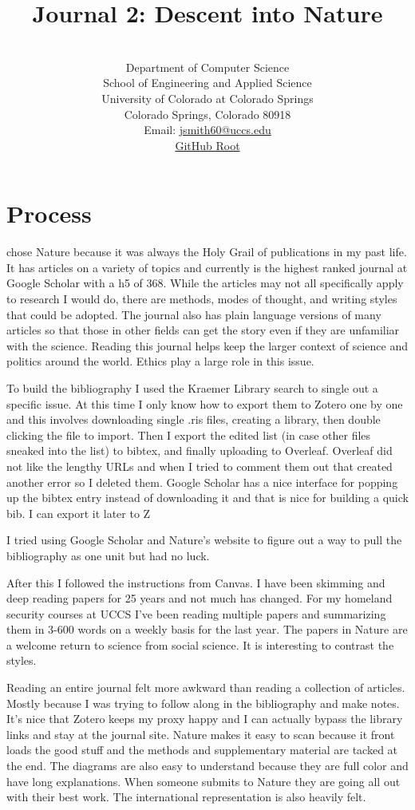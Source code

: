 \documentclass{article}
\title{Journal 2: Descent into Nature}
\author{\myname\\
Department of Computer Science\\School of Engineering and Applied Science\\University of Colorado at Colorado Springs\\Colorado Springs, Colorado 80918\\Email: \href{mailto:jsmith@uccs.edu}{jsmith60@uccs.edu}\\
\href{https://github.com/morisey/UCCS}{GitHub Root}
}
\begin{document}
\maketitle
\section{Process}
\lettrine[findent=2pt]{}{ }chose Nature \cite{nature} because it was always the Holy Grail of publications in my past life. It has articles on a variety of topics and currently is the highest ranked journal at Google Scholar with a h5 of 368. While the articles may not all specifically apply to research I would do, there are methods, modes of thought, and writing styles that could be adopted. The journal also has plain language versions of many articles so that those in other fields can get the story even if they are unfamiliar with the science. Reading this journal helps keep the larger context of science and politics around the world. Ethics play a large role in this issue.

To build the bibliography I used the Kraemer Library search to single out a specific issue. At this time I only know how to export them to Zotero one by one and this involves downloading single .ris files, creating a library, then double clicking the file to import. Then I export the edited list (in case other files sneaked into the list) to bibtex, and finally uploading to Overleaf. Overleaf did not like the lengthy URLs and when I tried to comment them out that created another error so I deleted them. Google Scholar has a nice interface for popping up the bibtex entry instead of downloading it and that is nice for building a quick bib. I can export it later to Z

I tried using Google Scholar and Nature's website to figure out a way to pull the bibliography as one unit but had no luck.

After this I followed the instructions from Canvas. I have been skimming and deep reading papers for 25 years and not much has changed. For my homeland security courses at UCCS I've been reading multiple papers and summarizing them in 3-600 words on a weekly basis for the last year. The papers in Nature are a welcome return to science from social science. It is interesting to contrast the styles.

Reading an entire journal felt more awkward than reading a collection of articles. Mostly because I was trying to follow along in the bibliography and make notes. It's nice that Zotero keeps my proxy happy and I can actually bypass the library links and stay at the journal site. Nature makes it easy to scan because it front loads the good stuff and the methods and supplementary material are tacked at the end. The diagrams are also easy to understand because they are full color and have long explanations. When someone submits to Nature they are going all out with their best work. The international representation is also heavily felt.
\end{document}
